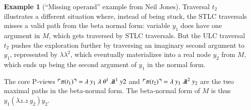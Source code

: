 \documentclass{elsarticle}
\theoremstyle{plain}
\theoremstyle{definition}
\newtheorem{example}{Example}[section]
\theoremstyle{remark}
\newcommand{\ghostlmd}{{\lambda\!\!\lambda}}
\newcommand{\ghostvar}{\theta}
\def\coresymbol{\pi} %
\newcommand{\core}[1]{\coresymbol(#1)} %
\begin{document}
\begin{example}[``Missing operand'' example from Neil Jones]
Traversal $t_2$ illustrates a different situation where, instead of being stuck, the STLC traversals misses a valid path from the beta normal form: variable $y_1$ does have one argument in $M$, which gets traversed by STLC traversals. But the ULC traversal $t_2$ pushes the exploration further by traversing an imaginary second argument to $y_1$, represented by $\ghostlmd^2$, which eventually materializes into a real node $y_2$ from $M$, which ends up being the second argument of $y_1$ in the normal form.

The core P-views
$\pview{\core{t_1}} = \lambda \ y_1\ \lambda \ \ghostvar^{1}
\ \ghostlmd^{1}\ y2$ and  $\pview{\core{t_2}} = \lambda\ y_1\ \ghostlmd^{2}\ y_2$ are the two maximal paths in the beta-normal form.
The beta-normal form of $M$ is thus $y_1 (\lambda  z.z\ y_2) y_2$.
\end{example}
\end{document}
